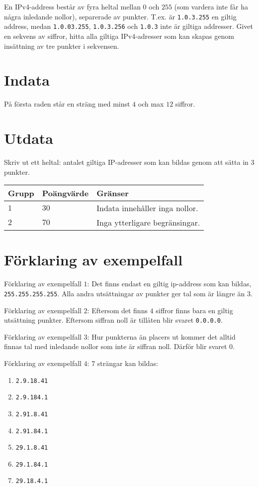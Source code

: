 En IPv4-address består av fyra heltal mellan $0$ och $255$ (som vardera inte får ha några inledande nollor), separerade av punkter.
T.ex. är \texttt{1.0.3.255} en giltig address, medan \texttt{1.0.03.255}, \texttt{1.0.3.256} och \texttt{1.0.3} inte är giltiga addresser.
Givet en sekvens av siffror, hitta alla giltiga IPv4-adresser som kan skapas genom insättning av tre punkter i sekvensen.

\section*{Indata}
På första raden står en sträng med minst $4$ och max $12$ siffror.

\section*{Utdata}
Skriv ut ett heltal: antalet giltiga IP-adresser som kan bildas genom att sätta in 3 punkter.


\noindent
\begin{tabular}{| l | l | p{12cm} |}
  \hline
  Grupp & Poängvärde & Gränser \\ \hline
  $1$    & $30$        & Indata innehåller inga nollor. \\ \hline 
  $2$    & $70$        & Inga ytterligare begränsingar. \\ \hline 
\end{tabular}


\section*{Förklaring av exempelfall}
Förklaring av exempelfall $1$: Det finns endast en giltig ip-address som kan bildas, \texttt{255.255.255.255}. Alla andra utsättningar av punkter ger tal som är längre än $3$.

Förklaring av exempelfall $2$: Eftersom det finns $4$ siffror finns bara en giltig utsättning punkter. Eftersom siffran noll är tillåten blir svaret \texttt{0.0.0.0}.

Förklaring av exempelfall $3$: Hur punkterna än placers ut kommer det alltid finnas tal med inledande nollor som inte är siffran noll. Därför blir svaret $0$.

Förklaring av exempelfall $4$: $7$ strängar kan bildas$\colon$
\begin{enumerate}
    \item \texttt{2.9.18.41}
    \item \texttt{2.9.184.1}
    \item \texttt{2.91.8.41}
    \item \texttt{2.91.84.1}
    \item \texttt{29.1.8.41}
    \item \texttt{29.1.84.1}
    \item \texttt{29.18.4.1}
\end{enumerate}

